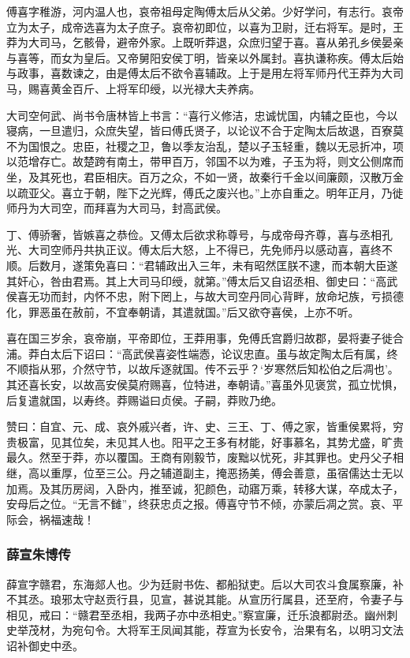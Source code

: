 \documentclass[]{article}
\begin{document}
傅喜字稚游，河内温人也，哀帝祖母定陶傅太后从父弟。少好学问，有志行。哀帝立为太子，成帝选喜为太子庶子。哀帝初即位，以喜为卫尉，迁右将军。是时，王莽为大司马，乞骸骨，避帝外家。上既听莽退，众庶归望于喜。喜从弟孔乡侯晏亲与喜等，而女为皇后。又帝舅阳安侯丁明，皆亲以外属封。喜执谦称疾。傅太后始与政事，喜数谏之，由是傅太后不欲令喜辅政。上于是用左将军师丹代王莽为大司马，赐喜黄金百斤、上将军印绶，以光禄大夫养病。

大司空何武、尚书令唐林皆上书言：``喜行义修洁，忠诚忧国，内辅之臣也，今以寝病，一旦遣归，众庶失望，皆曰傅氏贤子，以论议不合于定陶太后故退，百寮莫不为国恨之。忠臣，社稷之卫，鲁以季友治乱，楚以子玉轻重，魏以无忌折冲，项以范增存亡。故楚跨有南土，带甲百万，邻国不以为难，子玉为将，则文公侧席而坐，及其死也，君臣相庆。百万之众，不如一贤，故秦行千金以间廉颇，汉散万金以疏亚父。喜立于朝，陛下之光辉，傅氏之废兴也。''上亦自重之。明年正月，乃徙师丹为大司空，而拜喜为大司马，封高武侯。

丁、傅骄奢，皆嫉喜之恭俭。又傅太后欲求称尊号，与成帝母齐尊，喜与丞相孔光、大司空师丹共执正议。傅太后大怒，上不得已，先免师丹以感动喜，喜终不顺。后数月，遂策免喜曰：``君辅政出入三年，未有昭然匡朕不逮，而本朝大臣遂其奸心，咎由君焉。其上大司马印绶，就第。''傅太后又自诏丞相、御史曰：``高武侯喜无功而封，内怀不忠，附下罔上，与故大司空丹同心背畔，放命圮族，亏损德化，罪恶虽在赦前，不宜奉朝请，其遣就国。''后又欲夺喜侯，上亦不听。

喜在国三岁余，哀帝崩，平帝即位，王莽用事，免傅氏宫爵归故郡，晏将妻子徙合浦。莽白太后下诏曰：``高武侯喜姿性端悫，论议忠直。虽与故定陶太后有属，终不顺指从邪，介然守节，以故斥逐就国。传不云乎？`岁寒然后知松伯之后凋也'。其还喜长安，以故高安侯莫府赐喜，位特进，奉朝请。''喜虽外见褒赏，孤立忧惧，后复遣就国，以寿终。莽赐谥曰贞侯。子嗣，莽败乃绝。

赞曰：自宜、元、成、哀外戚兴者，许、史、三王、丁、傅之家，皆重侯累将，穷贵极富，见其位矣，未见其人也。阳平之王多有材能，好事慕名，其势尤盛，旷贵最久。然至于莽，亦以覆国。王商有刚毅节，废黜以忧死，非其罪也。史丹父子相继，高以重厚，位至三公。丹之辅道副主，掩恶扬美，傅会善意，虽宿儒达士无以加焉。及其历房闼，入卧内，推至诚，犯颜色，动寤万乘，转移大谋，卒成太子，安母后之位。``无言不雠''，终获忠贞之报。傅喜守节不倾，亦蒙后凋之赏。哀、平际会，祸福速哉！

\hypertarget{header-n5682}{%
\subsubsection{薛宣朱博传}\label{header-n5682}}

薛宣字赣君，东海郯人也。少为廷尉书佐、都船狱吏。后以大司农斗食属察廉，补不其丞。琅邪太守赵贡行县，见宣，甚说其能。从宣历行属县，还至府，令妻子与相见，戒曰：``赣君至丞相，我两子亦中丞相史。''察宣廉，迁乐浪都尉丞。幽州刺史举茂材，为宛句令。大将军王凤闻其能，荐宣为长安令，治果有名，以明习文法诏补御史中丞。
\end{document}

